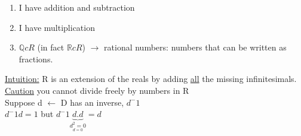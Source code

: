 \documentclass[a4paper, 12pt]{article}
\begin{document}
\begin{enumerate}
\begin{itemize}
\begin{enumerate}
\item I have addition and subtraction
\item I have multiplication
\item $\mathbb{Q} c R$ (in fact $\mathbb{R} c R $)
$\rightarrow$ rational numbers: numbers that can be written as fractions.\\
\end{enumerate}
\underline{Intuition:} R is an extension of the reals by adding \underline{all} the missing infinitesimals.\\
\underline{Caution} you cannot divide freely by numbers in R\\
Suppose d $\leftarrow$ D has an inverse, $d^-1$\\
${d^-1}{d} = 1$ but $d^-1\underbrace{d.d}_{\underset{d = 0}{d^2 = 0}} = d$
\end{itemize}
\end{enumerate}
\end{document}
